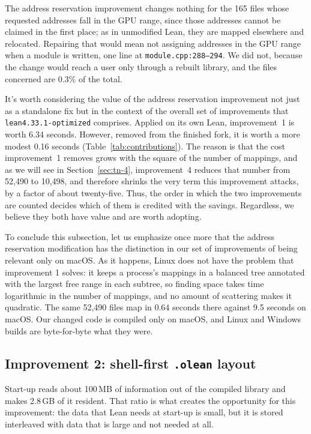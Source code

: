 \documentclass{article}
\newcommand{\Lean}{Lean\xspace}      %
\newcommand{\altlean}{\texttt{lean4.33.1-\allowbreak optimized}\xspace}
\begin{document}
The address reservation improvement changes nothing for the 165 files whose requested addresses fall in the GPU range, since those addresses cannot be claimed in the first place; as in unmodified \Lean, they are mapped elsewhere and relocated. Repairing that would mean not assigning addresses in the GPU range when a module is written, one line at \texttt{module.cpp:288--294}. We did not, because the change would reach a user only through a rebuilt library, and the files concerned are 0.3\% of the total.

It's worth considering the value of the address reservation improvement not just as a standalone fix but in the context of the overall set of improvements that \altlean comprises.
Applied on its own \Lean, improvement~1 is worth 6.34 seconds. However, removed from the finished fork, it is worth a more modest 0.16 seconds (Table~\ref{tab:contributions}). The reason is that the cost improvement~1 removes grows with the square of the number of mappings, and as we will see in Section~\ref{sec:tn-4}, improvement~4 reduces that number from 52{,}490 to 10{,}498, and therefore shrinks the very term this improvement attacks, by a factor of about twenty-five. Thus, the order in which the two improvements are counted decides which of them is credited with the savings. Regardless, we believe they both have value and are worth adopting.

To conclude this subsection, let us emphasize once more that the address reservation modification has the distinction in our set of improvements of being relevant only on macOS. As it happens, Linux does not have the problem that improvement 1 solves: it keeps a process's mappings in a balanced tree annotated with the largest free range in each subtree, so finding space takes time logarithmic in the number of mappings, and no amount of scattering makes it quadratic. The same 52{,}490 files map in 0.64 seconds there against 9.5 seconds on macOS. Our changed code is compiled only on macOS, and Linux and Windows builds are byte-for-byte what they were.

\subsection{Improvement 2: shell-first \texttt{.olean} layout}
\label{sec:tn-2}

Start-up reads about 100\,MB of information out of the compiled library and makes 2.8\,GB of it resident. That ratio is what creates the opportunity for this improvement: the data that \Lean needs at start-up is small, but it is stored interleaved with data that is large and not needed at all.
\end{document}
